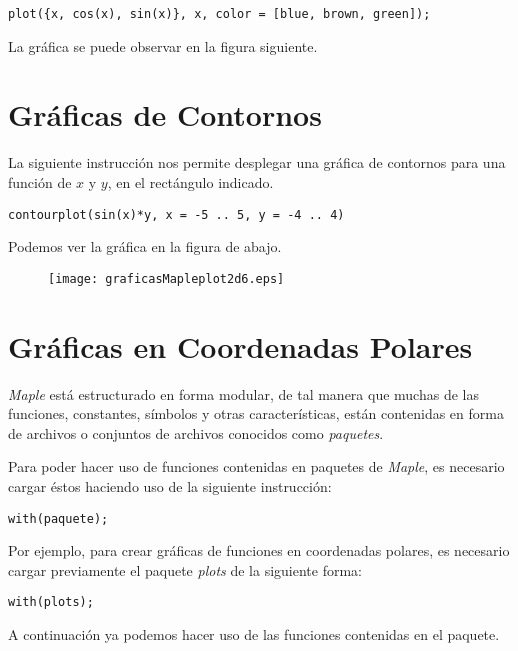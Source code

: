 \documentclass[letterpaper,12pt]{book}
\begin{document}
\begin{verbatim}
plot({x, cos(x), sin(x)}, x, color = [blue, brown, green]);
\end{verbatim}

La gráfica se puede observar en la figura siguiente.


\chapter{Gráficas de Contornos}

La siguiente instrucción nos permite desplegar una gráfica de contornos para una función de
$x$ y $y$, en el rectángulo indicado.

\begin{verbatim}
contourplot(sin(x)*y, x = -5 .. 5, y = -4 .. 4)
\end{verbatim}

Podemos ver la gráfica en la figura de abajo.

\begin{figure}[h!]
\centering
\texttt{[image: graficasMapleplot2d6.eps]}
\end{figure}


\chapter{Gráficas en Coordenadas Polares}

\emph{Maple} está estructurado en forma modular, de tal manera que muchas de las
funciones, constantes, símbolos y otras características, están contenidas en forma
de archivos o conjuntos de archivos conocidos como \emph{paquetes}. 

Para poder hacer uso de funciones contenidas en paquetes de \emph{Maple}, es 
necesario cargar éstos haciendo uso de la siguiente instrucción:

\begin{verbatim}
with(paquete);
\end{verbatim}

Por ejemplo, para crear gráficas de funciones en coordenadas polares, es necesario
cargar previamente el paquete \emph{plots} de la siguiente forma:

\begin{verbatim}
with(plots);
\end{verbatim}

A continuación ya podemos hacer uso de las funciones contenidas en el paquete.
\end{document}
